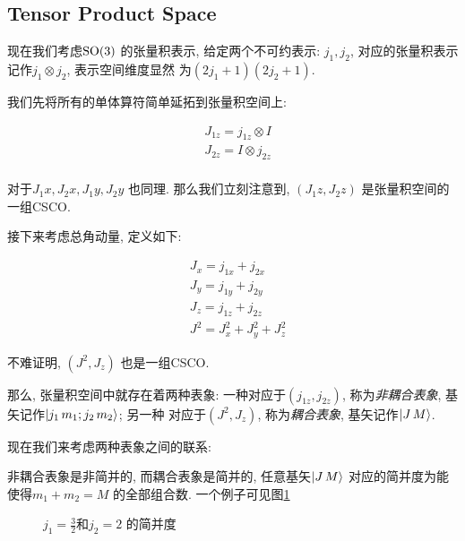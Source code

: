 \subsection{Tensor Product Space}

现在我们考虑${\rm SO}(3)$ 的张量积表示, 给定两个不可约表示:
$j_1,j_2$, 对应的张量积表示记作$j_1\otimes j_2$, 表示空间维度显然
为$(2j_1+1)(2j_2+1)$.

我们先将所有的单体算符简单延拓到张量积空间上:

\begin{equation}
  \begin{aligned}
    &J_{1z} = j_{1z}\otimes I \\
    &J_{2z} = I\otimes j_{2z}\\
  \end{aligned}
\end{equation}

对于$J_1x,J_2x,J_1y,J_2y$ 也同理. 那么我们立刻注意到, $(J_1z, J_2z)$ 
是张量积空间的一组CSCO.

接下来考虑总角动量, 定义如下:

\begin{equation}
  \begin{aligned}
    &J_{x} = j_{1x} + j_{2x}\\
    &J_{y} = j_{1y} + j_{2y}\\
    &J_{z} = j_{1z} + j_{2z}\\
    &J^{2} = J_{x}^{2} + J_{y}^{2} + J_{z}^{2}
  \end{aligned}
\end{equation}

不难证明, $(J^{2}, J_{z})$ 也是一组CSCO.

那么, 张量积空间中就存在着两种表象: 一种对应于$(j_{1z}, j_{2z})$,
称为\emph{非耦合表象}, 基矢记作$\ket{j_1\,m_1;j_2\,m_2}$; 另一种
对应于$(J^{2}, J_{z})$, 称为\emph{耦合表象}, 基矢记作$\ket{J\,M}$.

现在我们来考虑两种表象之间的联系:

\begin{property}
  非耦合表象是非简并的, 而耦合表象是简并的, 任意基矢$\ket{J\,M}$
  对应的简并度为能使得$m_1+m_2=M$ 的全部组合数. 一个例子可见图\ref{fig:angular_momentum_addition_1}
\end{property}

\begin{figure}[ht]
  \centering
  \caption{$j_1= \frac{3}{2}$和$j_2=2$ 的简并度}
  \label{fig:angular_momentum_addition_1}
\end{figure}

